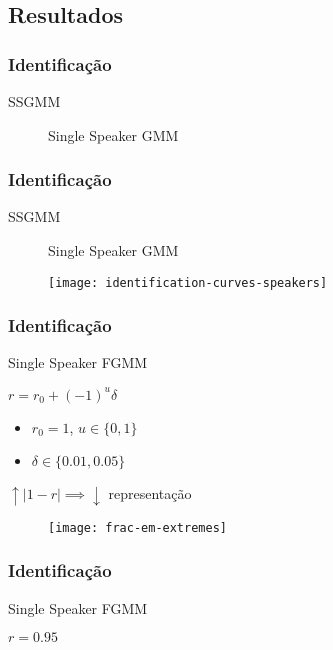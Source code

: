 \subsection{Resultados}

\begin{frame}
\frametitle{Identificação}
\begin{description}
    \item[SSGMM] Single Speaker GMM
\end{description}


\end{frame}

\begin{frame}
\frametitle{Identificação}
\begin{description}
    \item[SSGMM] Single Speaker GMM
\end{description}

\begin{figure}[ht]
    \centering
    \texttt{[image: identification-curves-speakers]}
\end{figure}
\end{frame}

\begin{frame}
\frametitle{Identificação}
\begin{description}
    \item[SSFGMM] Single Speaker FGMM
    \pause
    \item $r = r_0 + (-1)^u\delta$
    \pause
    \begin{itemize}
        \item $r_0 = 1$, $u \in \{0, 1\}$
        \item $\delta \in \{0.01, 0.05\}$
        \pause
    \end{itemize}
    \item $\uparrow |1 - r| \implies \downarrow$ representação
    \pause
\end{description}

\begin{figure}[ht]
    \centering
    \texttt{[image: frac-em-extremes]}
\end{figure}
\end{frame}

\begin{frame}
\frametitle{Identificação}
\begin{description}
    \item[SSFGMM] Single Speaker FGMM
    \item $r = 0.95$
\end{description}


\end{frame}

